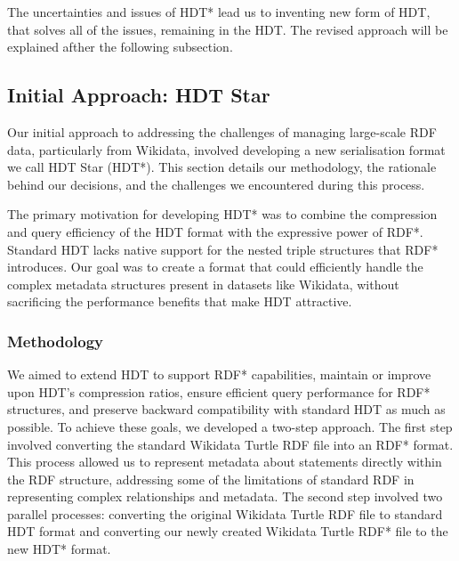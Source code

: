 The uncertainties and issues of HDT* lead us to inventing new form of HDT, that solves all of the issues, remaining in the HDT. The revised approach will be explained afther the following subsection.

\subsection{Initial Approach: HDT Star}

Our initial approach to addressing the challenges of managing large-scale RDF data, particularly from Wikidata, involved developing a new serialisation format we call HDT Star (HDT*). This section details our methodology, the rationale behind our decisions, and the challenges we encountered during this process.

The primary motivation for developing HDT* was to combine the compression and query efficiency of the HDT format with the expressive power of RDF*. Standard HDT lacks native support for the nested triple structures that RDF* introduces. Our goal was to create a format that could efficiently handle the complex metadata structures present in datasets like Wikidata, without sacrificing the performance benefits that make HDT attractive.

\subsubsection{Methodology}

We aimed to extend HDT to support RDF* capabilities, maintain or improve upon HDT's compression ratios, ensure efficient query performance for RDF* structures, and preserve backward compatibility with standard HDT as much as possible. To achieve these goals, we developed a two-step approach. The first step involved converting the standard Wikidata Turtle RDF file into an RDF* format. This process allowed us to represent metadata about statements directly within the RDF structure, addressing some of the limitations of standard RDF in representing complex relationships and metadata. The second step involved two parallel processes: converting the original Wikidata Turtle RDF file to standard HDT format and converting our newly created Wikidata Turtle RDF* file to the new HDT* format.


